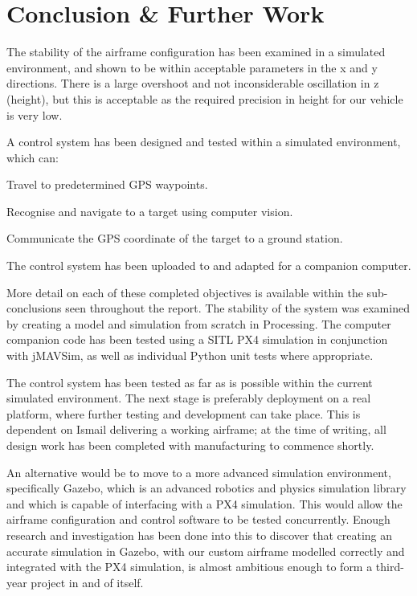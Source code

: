\documentclass[11pt,twoside]{article}
\begin{document}
\section{Conclusion \& Further Work}
\begin{compactenum}
    \item The stability of the airframe configuration has been examined in a simulated environment, and shown to be within acceptable parameters in the x and y directions. There is a large overshoot and not inconsiderable oscillation in z (height), but this is acceptable as the required precision in height for our vehicle is very low.
    \item A control system has been designed and tested within a simulated environment, which can:
    \begin{compactenum}
        \item Travel to predetermined GPS waypoints.
        \item Recognise and navigate to a target using computer vision.
        \item Communicate the GPS coordinate of the target to a ground station.
    \end{compactenum}
    \item The control system has been uploaded to and adapted for a companion computer.
\end{compactenum}
\vspace{1em}

More detail on each of these completed objectives is available within the sub-conclusions seen throughout the report. The stability of the system was examined by creating a model and simulation from scratch in Processing. The computer companion code has been tested using a SITL PX4 simulation in conjunction with jMAVSim, as well as individual Python unit tests where appropriate.

The control system has been tested as far as is possible within the current simulated environment. The next stage is preferably deployment on a real platform, where further testing and development can take place. This is dependent on Ismail delivering a working airframe; at the time of writing, all design work has been completed with manufacturing to commence shortly\cite{Ismail_paper}.

An alternative would be to move to a more advanced simulation environment, specifically Gazebo, which is an advanced robotics and physics simulation library and which is capable of interfacing with a PX4 simulation\cite{PX4_dev_guide}. This would allow the airframe configuration and control software to be tested concurrently. Enough research and investigation has been done into this to discover that creating an accurate simulation in Gazebo, with our custom airframe modelled correctly and integrated with the PX4 simulation, is almost ambitious enough to form a third-year project in and of itself.
\end{document}
